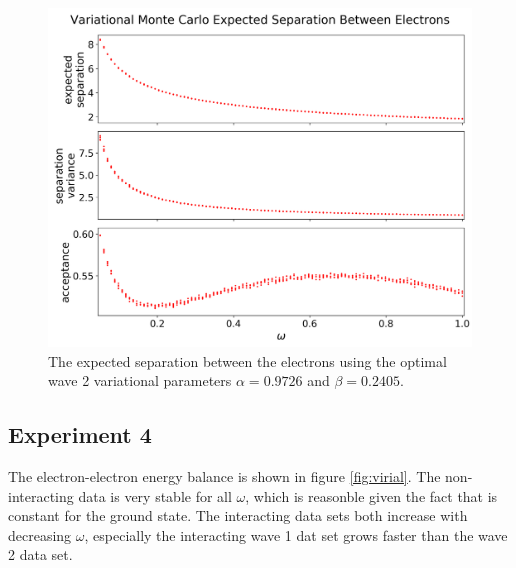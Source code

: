 \documentclass[nofootinbib,reprint,english]{revtex4-1}
\begin{document}
\begin{figure}
\centering
\includegraphics[scale=0.34]{../results/wave2/expected_separation_1_edited.png}
\caption{The expected separation between the electrons using the optimal wave 2 variational parameters \(\alpha=0.9726\) and \(\beta=0.2405\).}\label{fig:wave2_separation}
\end{figure}

\subsection{Experiment 4}
The electron-electron energy balance is shown in figure \ref{fig:virial}. The non-interacting data is very stable for all \(\omega\), which is reasonble given the fact that is constant for the ground state. The interacting data sets both increase with decreasing \(\omega\), especially the interacting wave 1 dat set grows faster than the wave 2 data set.
\end{document}

